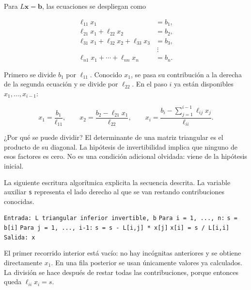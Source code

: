\documentclass[12pt,a4paper]{article}
\begin{document}
Para $L\mathbf x=\mathbf b$, las ecuaciones se despliegan como

\[
\begin{aligned}
\ell_{11}x_1&=b_1,\\
\ell_{21}x_1+\ell_{22}x_2&=b_2,\\
\ell_{31}x_1+\ell_{32}x_2+\ell_{33}x_3&=b_3,\\
&\ \vdots\\
\ell_{n1}x_1+\cdots+\ell_{nn}x_n&=b_n.
\end{aligned}
\]

Primero se divide $b_1$ por $\ell_{11}$. Conocido $x_1$, se pasa su contribución a la derecha de la segunda ecuación y se divide por $\ell_{22}$. En el paso $i$ ya están disponibles $x_1,\ldots,x_{i-1}$:

\[
x_1=\frac{b_1}{\ell_{11}},\qquad
x_2=\frac{b_2-\ell_{21}x_1}{\ell_{22}},\qquad
\boxed{x_i=\frac{b_i-\sum_{j=1}^{i-1}\ell_{ij}x_j}{\ell_{ii}}}.
\]

¿Por qué se puede dividir? El determinante de una matriz triangular es el producto de su diagonal. La hipótesis de invertibilidad implica que ninguno de esos factores es cero. No es una condición adicional olvidada: viene de la hipótesis inicial.

La siguiente escritura algorítmica explicita la secuencia descrita. La variable auxiliar \texttt{s} representa el lado derecho al que se van restando contribuciones conocidas.

\begin{algorithm}[H]
\small\DontPrintSemicolon
\hspace*{0.0em}\texttt{Entrada: L triangular inferior invertible, b}\;
\hspace*{0.0em}\texttt{Para i = 1, ..., n:}\;
\hspace*{0.7em}\texttt{s = b[i]}\;
\hspace*{0.7em}\texttt{Para j = 1, ..., i-1:}\;
\hspace*{1.4em}\texttt{s = s - L[i,j] * x[j]}\;
\hspace*{0.7em}\texttt{x[i] = s / L[i,i]}\;
\hspace*{0.0em}\texttt{Salida: x}\;
\end{algorithm}

El primer recorrido interior está vacío: no hay incógnitas anteriores y se obtiene directamente $x_1$. En una fila posterior se usan únicamente valores ya calculados. La división se hace después de restar todas las contribuciones, porque entonces queda $\ell_{ii}x_i=s$.
\end{document}
